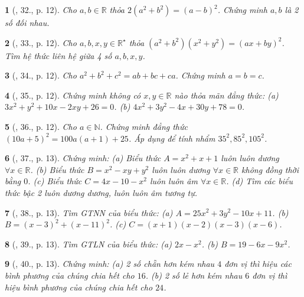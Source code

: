 \documentclass{article}
\newtheorem{baitoan}{}
\begin{document}
\begin{baitoan}[\cite{Tuyen_Toan_8}, 32., p. 12]
	Cho $a,b\in\mathbb{R}$ thỏa $2(a^2 + b^2) = (a - b)^2$. Chứng minh $a,b$ là 2 số đối nhau.
\end{baitoan}

\begin{baitoan}[\cite{Tuyen_Toan_8}, 33., p. 12]
	Cho $a,b,x,y\in\mathbb{R}^\star$ thỏa $(a^2 + b^2)(x^2 + y^2) = (ax + by)^2$. Tìm hệ thức liên hệ giữa 4 số $a,b,x,y$.
\end{baitoan}

\begin{baitoan}[\cite{Tuyen_Toan_8}, 34., p. 12]
	Cho $a^2 + b^2 + c^2 = ab + bc + ca$. Chứng minh $a = b = c$.
\end{baitoan}

\begin{baitoan}[\cite{Tuyen_Toan_8}, 35., p. 12]
	Chứng minh không có $x,y\in\mathbb{R}$ nào thỏa mãn đẳng thức: (a) $3x^2 + y^2 + 10x - 2xy + 26 = 0$. (b) $4x^2 + 3y^2 - 4x + 30y + 78 = 0$.
\end{baitoan}

\begin{baitoan}[\cite{Tuyen_Toan_8}, 36., p. 12]
	Cho $a\in\mathbb{N}$. Chứng minh đẳng thức $(10a + 5)^2 = 100a(a + 1) + 25$. Áp dụng để tính nhẩm $35^2,85^2,105^2$.
\end{baitoan}

\begin{baitoan}[\cite{Tuyen_Toan_8}, 37., p. 13]
	Chứng minh: (a) Biểu thức $A = x^2 + x + 1$ luôn luôn dương $\forall x\in\mathbb{R}$. (b) Biểu thức $B = x^2 - xy + y^2$ luôn luôn dương $\forall x\in\mathbb{R}$ không đồng thời bằng $0$. (c) Biểu thức $C = 4x - 10 - x^2$ luôn luôn âm $\forall x\in\mathbb{R}$. (d) Tìm các biểu thức bậc 2 luôn dương dương, luôn luôn âm tương tự.
\end{baitoan}

\begin{baitoan}[\cite{Tuyen_Toan_8}, 38., p. 13]
	Tìm {\rm GTNN} của biểu thức: (a) $A = 25x^2 + 3y^2 - 10x + 11$. (b) $B = (x - 3)^2 + (x - 11)^2$. (c) $C = (x + 1)(x - 2)(x - 3)(x - 6)$.
\end{baitoan}

\begin{baitoan}[\cite{Tuyen_Toan_8}, 39., p. 13]
	Tìm {\rm GTLN} của biểu thức: (a) $2x - x^2$. (b) $B = 19 - 6x - 9x^2$.
\end{baitoan}

\begin{baitoan}[\cite{Tuyen_Toan_8}, 40., p. 13]
	Chứng minh: (a) 2 số chẵn hơn kém nhau $4$ đơn vị thì hiệu các bình phương của chúng chia hết cho $16$. (b) 2 số lẻ hơn kém nhau $6$ đơn vị thì hiệu bình phương của chúng chia hết cho $24$.
\end{baitoan}
\end{document}
